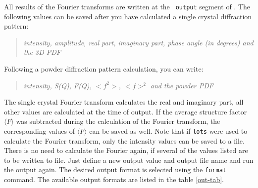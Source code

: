 All results of the Fourier transforms are written at the {\tt
output} segment of {\Discus}.  The following values can be saved
after you have calculated a single crystal diffraction pattern:
%
\begin{quote}
        {\it intensity, amplitude, real part, imaginary part, 
             phase angle (in degrees) and the 3D PDF }
\end{quote}
%
Following a powder diffraction pattern calculation, you can write:
%
\begin{quote}
        {\it intensity, S(Q), F(Q), $<f^2>$, $<f>^2$ 
             and the powder PDF}
\end{quote}
%
The single crystal Fourier transform calculates the real and 
imaginary part, all
other values are calculated at the time of output.  If the average
structure factor $\langle F \rangle$ was subtracted during the
calculation of the Fourier transform, the corresponding values of
$\langle F \rangle$ can be saved as well.  Note that if {\tt lots}
were used to calculate the Fourier transform, only the intensity
values can be saved to a file.  There is no need to calculate the
Fourier again, if several of the values listed are to be written to
file. Just define a new output value and output file name and run
the output again. The desired output format is selected using the
{\tt format} command. The available output formats are listed in the
table \ref{out-tab}.
%
